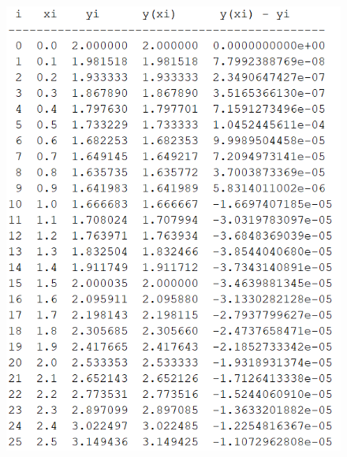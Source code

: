 \documentclass{LabReport}
\begin{document}
\begin{figure}[h!] %
	\begin{minipage}[t]{0.48\textwidth} %
		\centering
		\includegraphics[width=\linewidth]{figures/result_table1} %
		\label{fig:left_image} %
	\end{minipage}
	\hfill %
	\begin{minipage}[t]{0.48\textwidth} %
		\centering

\end{minipage}
\end{figure}
\end{document}
